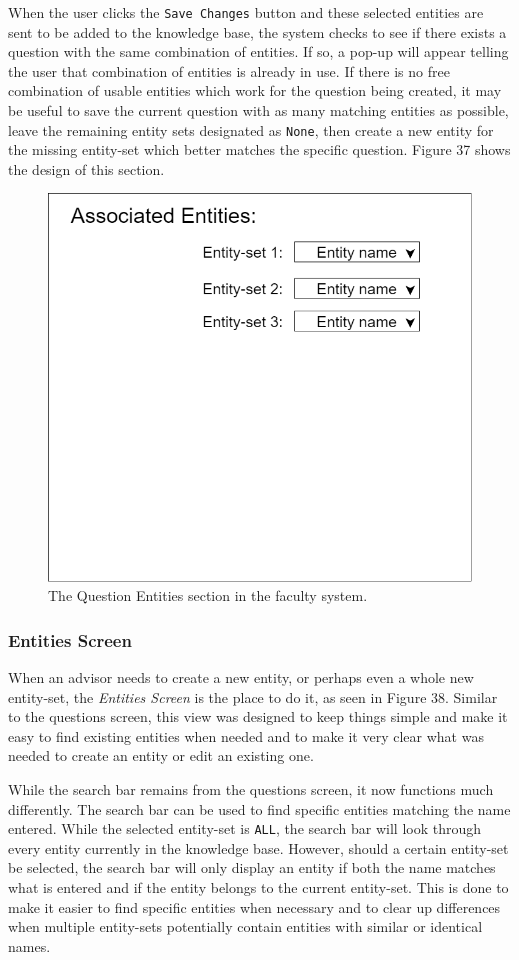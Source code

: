 \documentclass[titlepage, 12pt]{article}
\begin{document}
When the user clicks the \texttt{Save Changes} button and these selected entities are sent to be added to the knowledge base, the system checks to see if there exists a question with the same combination of entities. If so, a pop-up will appear telling the user that combination of entities is already in use. If there is no free combination of usable entities which work for the question being created, it may be useful to save the current question with as many matching entities as possible, leave the remaining entity sets designated as \texttt{None}, then create a new entity for the missing entity-set which better matches the specific question. Figure 37 shows the design of this section.

\begin{figure}[h]
    \centering\includegraphics[width=0.75\linewidth]{images/system-design/faculty-questions-entities.png}
    \caption{The Question Entities section in the faculty system.}
\end{figure}

\subsubsection{Entities Screen}

When an advisor needs to create a new entity, or perhaps even a whole new entity-set, the \emph{Entities Screen} is the place to do it, as seen in Figure 38. Similar to the questions screen, this view was designed to keep things simple and make it easy to find existing entities when needed and to make it very clear what was needed to create an entity or edit an existing one. 

While the search bar remains from the questions screen, it now functions much differently. The search bar can be used to find specific entities matching the name entered. While the selected entity-set is \texttt{ALL}, the search bar will look through every entity currently in the knowledge base. However, should a certain entity-set be selected, the search bar will only display an entity if both the name matches what is entered and if the entity belongs to the current entity-set. This is done to make it easier to find specific entities when necessary and to clear up differences when multiple entity-sets potentially contain entities with similar or identical names.
\end{document}
